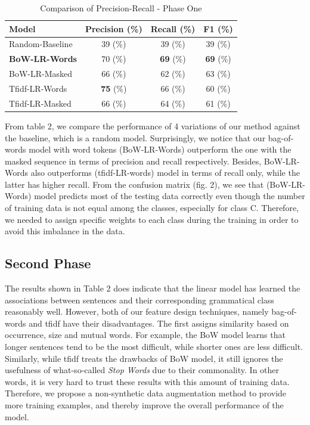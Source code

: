 \begin{table}
\centering
\caption {Comparison of Precision-Recall - Phase One}
\begin{tabular}{l|c|c|c}
Model  &  Precision (\%) &  Recall (\%)  & F1 (\%) \\
\hline
Random-Baseline  &  39 (\%) &  39 (\%)  & 39 (\%) \\
\textbf{BoW-LR-Words}  &  70 (\%) &  \textbf{69} (\%)  & \textbf{69} (\%) \\
BoW-LR-Masked  &  66 (\%) &  62 (\%)  & 63 (\%) \\
Tfidf-LR-Words  &  \textbf{75} (\%) &  66 (\%)  & 60 (\%) \\
Tfidf-LR-Masked  &  66 (\%) &  64 (\%)  & 61 (\%) \\
\hline

\end{tabular}
\label {tb:flickre2e}
\end{table}

From table 2, we compare the performance of 4 variations of our method against the baseline, which is a random model. Surprisingly, we notice that our bag-of-words model with word tokens (BoW-LR-Words) outperform the one with the masked sequence in terms of precision and recall respectively. Besides, BoW-LR-Words also outperforms (tfidf-LR-words) model in terms of recall only, while the latter has higher recall. From the confusion matrix (fig. 2), we see that (BoW-LR-Words) model predicts most of the testing data correctly even though the number of training data is not equal among the classes, especially for class C. Therefore, we needed to assign specific weights to each class during the training in order to avoid this imbalance in the data. 

\subsection{Second Phase}

The results shown in Table 2 does indicate that the linear model has learned the associations between sentences and their corresponding grammatical class reasonably well. However, both of our feature design techniques, namely bag-of-words and tfidf have their disadvantages. The first assigns similarity based on occurrence, size and mutual words. For example, the BoW model learns that longer sentences tend to be the most difficult, while shorter ones are less difficult. Similarly, while tfidf treats the drawbacks of BoW model, it still ignores the usefulness of what-so-called \textit{Stop Words} due to their commonality. In other words, it is very hard to trust these results with this amount of training data. Therefore, we propose a non-synthetic data augmentation method to provide more training examples, and thereby improve the overall performance of the model. 

